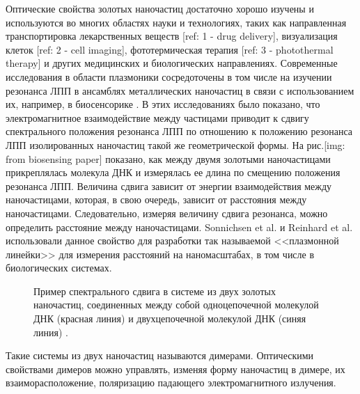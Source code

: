 Оптические свойства золотых наночастиц достаточно хорошо изучены и используются во многих областях науки и технологиях, таких как направленная транспортировка лекарственных веществ [ref: 1 - drug delivery], визуализация клеток [ref: 2 - cell imaging], фототермическая терапия [ref: 3 - photothermal therapy] и других медицинских и биологических направлениях. Современные исследования в области плазмоники сосредоточены в том числе на изучении резонанса ЛПП в ансамблях металлических наночастиц в связи с использованием их, например, в биосенсорике \cite{biosensing}. В этих исследованиях было показано, что электромагнитное взаимодействие между частицами приводит к сдвигу спектрального положения резонанса ЛПП по отношению к положению резонанса ЛПП изолированных наночастиц такой же геометрической формы. На рис.[img: from biosensing paper] показано, как между двумя золотыми наночастицами прикреплялась молекула ДНК и измерялась ее длина по смещению положения резонанса ЛПП. Величина сдвига зависит от энергии взаимодействия между наночастицами, которая, в свою очередь, зависит от расстояния между наночастицами. Следовательно, измеряя величину сдвига резонанса, можно определить расстояние между наночастицами. Sonnichsen et al. \cite{bioplasmonruler} и Reinhard et al. \cite{bioplasmonruler2} использовали данное свойство для разработки так называемой  <<плазмонной линейки>> для измерения расстояний на наномасштабах, в том числе в биологических системах.
\begin{figure}
\caption{Пример спектрального сдвига в системе из двух золотых наночастиц, соединенных между собой одноцепочечной молекулой ДНК (красная линия) и двухцепочечной молекулой ДНК (синяя линия) \cite{biosensing}.}
\label{img:PR_SEM}
\end{figure}
Такие системы из двух наночастиц называются димерами. Оптическими свойствами димеров можно управлять, изменяя форму наночастиц в димере, их взаиморасположение, поляризацию падающего электромагнитного излучения.

